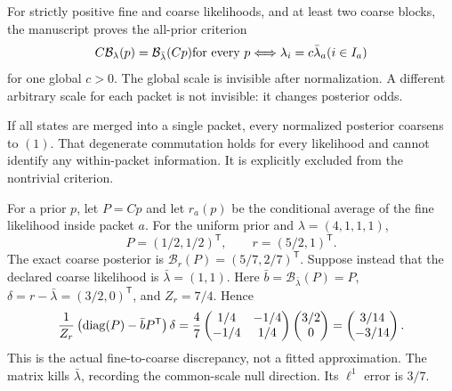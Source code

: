 For strictly positive fine and coarse likelihoods, and at least two coarse blocks, the manuscript proves the all-prior criterion
\[
C\mathcal B_\lambda(p)=\mathcal B_{\bar\lambda}(Cp)\quad\hbox{for every }p
\quad\Longleftrightarrow\quad
\lambda_i=c\bar\lambda_a\quad(i\in I_a)
\]
for one global $c>0$. The global scale is invisible after normalization. A different arbitrary scale for each packet is not invisible: it changes posterior odds.

If all states are merged into a single packet, every normalized posterior coarsens to $(1)$. That degenerate commutation holds for every likelihood and cannot identify any within-packet information. It is explicitly excluded from the nontrivial criterion.

For a prior $p$, let $P=Cp$ and let $r_a(p)$ be the conditional average of the fine likelihood inside packet $a$. For the uniform prior and $\lambda=(4,1,1,1)$,
\[
P=(1/2,1/2)^{\mathsf T},\qquad r=(5/2,1)^{\mathsf T}.
\]
The exact coarse posterior is $\mathcal B_r(P)=(5/7,2/7)^{\mathsf T}$. Suppose instead that the declared coarse likelihood is $\bar\lambda=(1,1)$.
Here $\bar b=\mathcal B_{\bar\lambda}(P)=P$, $\delta=r-\bar\lambda=(3/2,0)^{\mathsf T}$, and $Z_r=7/4$. Hence
\[
\frac1{Z_r}\left(\diag(P)-\bar bP^{\mathsf T}\right)\delta
=\frac4{7}\begin{pmatrix}1/4&-1/4\\-1/4&1/4\end{pmatrix}
\begin{pmatrix}3/2\\0\end{pmatrix}
=\begin{pmatrix}3/14\\-3/14\end{pmatrix}.
\]
This is the actual fine-to-coarse discrepancy, not a fitted approximation. The matrix kills $\bar\lambda$, recording the common-scale null direction. Its $\ell^1$ error is $3/7$.

